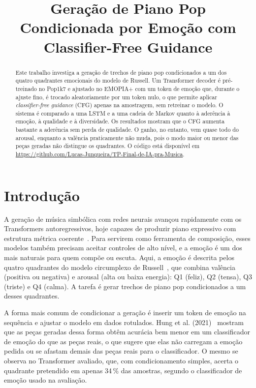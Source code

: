 \documentclass{article}
\title{Geração de Piano Pop Condicionada por Emoção com Classifier-Free Guidance}
\begin{document}
\maketitle

\begin{abstract}
  Este trabalho investiga a geração de trechos de piano pop condicionados a um
  dos quatro quadrantes emocionais do modelo de Russell. Um Transformer decoder
  é pré-treinado no Pop1k7 e ajustado no EMOPIA+ com um token de emoção que,
  durante o ajuste fino, é trocado aleatoriamente por um token nulo, o que
  permite aplicar \emph{classifier-free guidance} (CFG) apenas na amostragem,
  sem retreinar o modelo. O sistema é comparado a uma LSTM e a uma cadeia de
  Markov quanto à aderência à emoção, à qualidade e à diversidade. Os resultados
  mostram que o CFG aumenta bastante a aderência sem perda de qualidade. O
  ganho, no entanto, vem quase todo do arousal, enquanto a valência praticamente
  não muda, pois o modo maior ou menor das peças geradas não distingue os
  quadrantes. O código está disponível em
  \url{https://github.com/Lucas-Junqueira/TP-Final-de-IA-pra-Musica}.
\end{abstract}

\section{Introdução}\label{sec:intro}

A geração de música simbólica com redes neurais avançou rapidamente com os
Transformers autoregressivos, hoje capazes de produzir piano expressivo com
estrutura métrica coerente~\cite{Huang2019:musictransformer,Huang2020:remi}.
Para servirem como ferramenta de composição, esses modelos também precisam
aceitar controles de alto nível, e a emoção é um dos mais naturais para quem
compõe ou escuta. Aqui, a emoção é descrita pelos quatro quadrantes do modelo
circumplexo de Russell~\cite{Russell1980:circumplex}, que combina valência
(positiva ou negativa) e arousal (alta ou baixa energia): Q1 (feliz), Q2
(tensa), Q3 (triste) e Q4 (calma). A tarefa é gerar trechos de piano pop
condicionados a um desses quadrantes.

A forma mais comum de condicionar a geração é inserir um token de emoção na
sequência e ajustar o modelo em dados rotulados. Hung et al.
(2021)~\cite{Hung2021:emopia} mostram que as peças geradas dessa forma obtêm
acurácia bem menor em um classificador de emoção do que as peças reais, o que
sugere que elas não carregam a emoção pedida ou se afastam demais das peças
reais para o classificador. O mesmo se observa no Transformer avaliado, que, com
condicionamento simples, acerta o quadrante pretendido em apenas 34\,\% das
amostras, segundo o classificador de emoção usado na avaliação.
\end{document}
